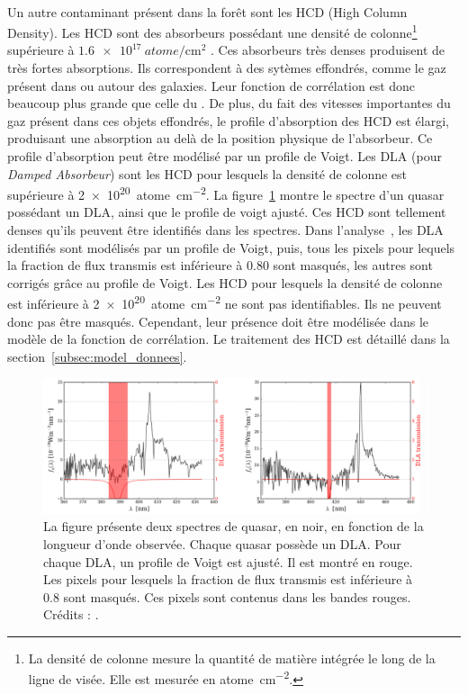 \paragraph{}
Un autre contaminant présent dans la forêt \lya{} sont les HCD (High Column Density). Les HCD sont des absorbeurs possédant une densité de colonne\footnote{La densité de colonne mesure la quantité de matière intégrée le long de la ligne de visée. Elle est mesurée en \si{atome\per\centi\meter\squared}.} supérieure à $\SI{1.6e17}{atome\per\centi\meter\squared}$ \autocite{Rogers2017}. Ces absorbeurs très denses produisent de très fortes absorptions. Ils correspondent à des sytèmes effondrés, comme le gaz présent dans ou autour des galaxies. Leur fonction de corrélation est donc beaucoup plus grande que celle du \lya{}. De plus, du fait des vitesses importantes du gaz présent dans ces objets effondrés, le profile d'absorption des HCD est élargi, produisant une absorption au delà de la position physique de l'absorbeur. Ce profile d'absorption peut être modélisé par un profile de Voigt.
Les DLA (pour \emph{Damped \lya{} Absorbeur}) sont les HCD pour lesquels la densité de colonne est supérieure à \SI{2e20}{atome\per\centi\meter\squared}.
La figure~\ref{fig:exemple_dla} montre le spectre d'un quasar possédant un DLA, ainsi que le profile de voigt ajusté.
Ces HCD sont tellement denses qu'ils peuvent être identifiés dans les spectres. Dans l'analyse~\cite{DuMasdesBourboux2020}, les DLA identifiés sont modélisés par un profile de Voigt, puis, tous les pixels pour lequels la fraction de flux transmis est inférieure à \num{0.80} sont masqués, les autres sont corrigés grâce au profile de Voigt.
Les HCD pour lesquels la densité de colonne est inférieure à \SI{2e20}{atome\per\centi\meter\squared} ne sont pas identifiables. Ils ne peuvent donc pas être masqués.
Cependant, leur présence doit être modélisée dans le modèle de la fonction de corrélation.
Le traitement des HCD est détaillé dans la section~\ref{subsec:model_donnees}.
\begin{figure}
  \centering
  \includegraphics[scale=0.4]{exemple_dla}
  \caption{La figure présente deux spectres de quasar, en noir, en fonction de la longueur d'onde observée. Chaque quasar possède un DLA. Pour chaque DLA, un profile de Voigt est ajusté. Il est montré en rouge. Les pixels pour lesquels la fraction de flux transmis est inférieure à \num{0.8} sont masqués. Ces pixels sont contenus dans les bandes rouges. Crédits : \textcite{DeSainteAgathe}.}
  \label{fig:exemple_dla}
\end{figure}



% 
% 
